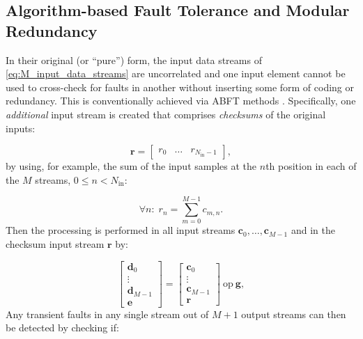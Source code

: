\documentclass[twocolumn,english,onecolumn]{IEEEtran}
\theoremstyle{plain}
\theoremstyle{plain}
\begin{document}
\subsection{Algorithm-based Fault Tolerance and Modular Redundancy}

In their original (or ``pure'') form, the input data streams of
\eqref{eq:M_input_data_streams} are uncorrelated and one input element
cannot be used to cross-check for faults in another without inserting
some form of coding or redundancy. This is conventionally achieved
via ABFT methods \cite{huang1984algorithm,chen2005fault,luk1985weighted,stefanidis2004weighted,nair1988linearCode,sloan2012algorithmic,rexford1992partitioned}.
Specifically, one \emph{additional} input stream is created that comprises
\emph{checksums} of the original inputs:

\begin{equation}
\mathbf{r}=\begin{bmatrix}r_{0} & \ldots & r_{N_{\text{in}}-1}\end{bmatrix},\label{eq:P_redundant_data_streams}
\end{equation}
by using, for example, the sum of the input samples \cite{rexford1992partitioned,sloan2012algorithmic}
at the $n$th position in each of the $M$ streams, $0\leq n<N_{\text{in}}$:

\begin{equation}
\forall n:\; r_{n}=\sum_{m=0}^{M-1}c_{m,n}.\label{eq:redundant_element_definition}
\end{equation}
Then the processing is performed in all input streams $\mathbf{c}_{0},\ldots,\mathbf{c}_{M-1}$
and in the checksum input stream $\mathbf{r}$ by:

\begin{equation}
\begin{bmatrix}\mathbf{d}_{0}\\
\vdots\\
\mathbf{d}_{M-1}\\
\mathbf{e}
\end{bmatrix}=\begin{bmatrix}\mathbf{c}_{0}\\
\vdots\\
\mathbf{c}_{M-1}\\
\mathbf{r}
\end{bmatrix}\:\text{op}\:\mathbf{g},\label{eq:operation_on_inputs_and_redundant_inputs}
\end{equation}
Any transient faults in any single stream out of $M+1$ output streams
can then be detected by checking if:
\end{document}
